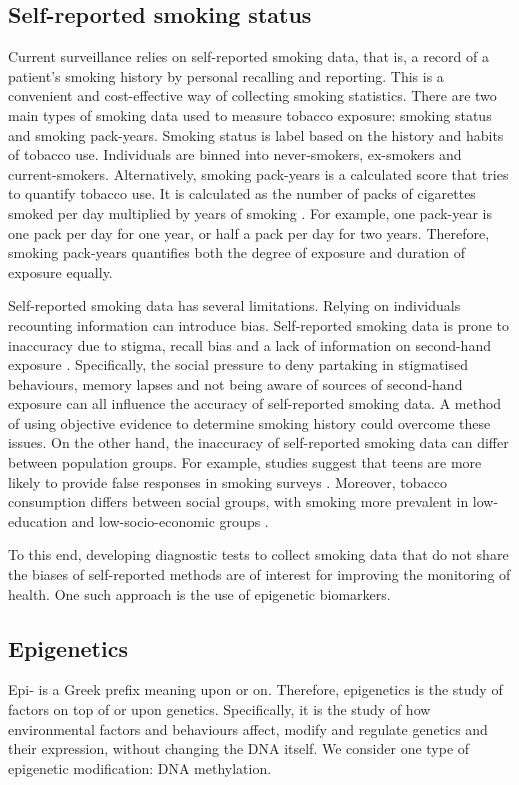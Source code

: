 \documentclass[draft]{article}
\begin{document}
\subsection{Self-reported smoking status} \label{sec:srss}
Current surveillance relies on self-reported smoking data, that is, a record of a patient's smoking history by personal recalling and reporting. This is a convenient and cost-effective way of collecting smoking statistics. There are two main types of smoking data used to measure tobacco exposure: smoking status and smoking pack-years. Smoking status is label based on the history and habits of tobacco use. Individuals are binned into never-smokers, ex-smokers and current-smokers. Alternatively, smoking pack-years is a calculated score that tries to quantify tobacco use. It is calculated as the number of packs of cigarettes smoked per day multiplied by years of smoking \cite{smokingpackyears}. For example, one pack-year is one pack per day for one year, or half a pack per day for two years. Therefore, smoking pack-years quantifies both the degree of exposure and duration of exposure equally.

Self-reported smoking data has several limitations. Relying on individuals recounting information can introduce bias. Self-reported smoking data is prone to inaccuracy due to stigma, recall bias and a lack of information on second-hand exposure \cite{park2015correlation, gorber2009accuracy}. Specifically, the social pressure to deny partaking in stigmatised behaviours, memory lapses and not being aware of sources of second-hand exposure can all influence the accuracy of self-reported smoking data. A method of using objective evidence to determine smoking history could overcome these issues. On the other hand, the inaccuracy of self-reported smoking data can differ between population groups. For example, studies suggest that teens are more likely to provide false responses in smoking surveys \cite{park2015correlation}. Moreover, tobacco consumption differs between social groups, with smoking more prevalent in low-education and low-socio-economic groups \cite{cdc2019_smoking}.

To this end, developing diagnostic tests to collect smoking data that do not share the biases of self-reported methods are of interest for improving the monitoring of health. One such approach is the use of epigenetic biomarkers.

\subsection{Epigenetics}
Epi- is a Greek prefix meaning upon or on. Therefore, epigenetics is the study of factors on top of or upon genetics. Specifically, it is the study of how environmental factors and behaviours affect, modify and regulate genetics and their expression, without changing the DNA itself. We consider one type of epigenetic modification: DNA methylation.
\end{document}
